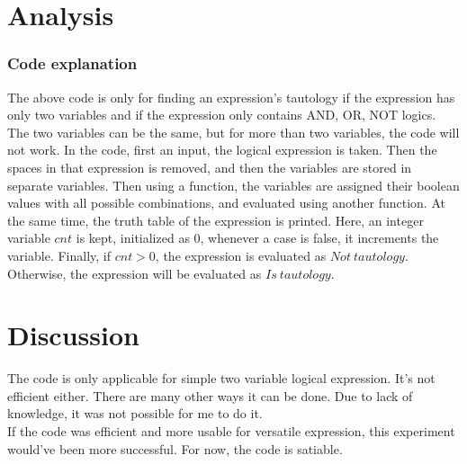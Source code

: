 \documentclass[12pt]{article}
\begin{document}
\section*{Analysis}
\subsubsection*{Code explanation}
The above code is only for finding an expression's tautology if the expression has only two variables and if the expression only contains AND, OR, NOT logics. The two variables can be the same, but for more than two variables, the code will not work.
In the code, first an input, the logical expression is taken. Then the spaces in that expression is removed, and then the variables are stored in separate variables. Then using a function, the variables are assigned their boolean values with all possible combinations, and evaluated using another function. At the same time, the truth table of the expression is printed.
Here, an integer variable $cnt$ is kept, initialized as $0$, whenever a case is false, it increments the variable. Finally, if $cnt > 0$, the expression is evaluated as $Not\ tautology$. Otherwise, the expression will be evaluated as $Is\ tautology$.

\section*{Discussion}
The code is only applicable for simple two variable logical expression. It's not efficient either. There are many other ways it can be done. Due to lack of knowledge, it was not possible for me to do it.
\\If the code was efficient and more usable for versatile expression, this experiment would've been more successful. For now, the code is satiable.



\end{document}
